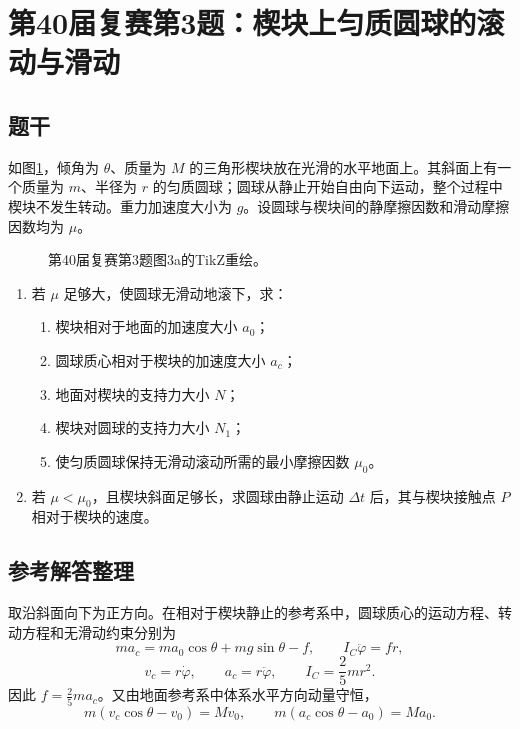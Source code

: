 \section{第40届复赛第3题：楔块上匀质圆球的滚动与滑动}

\subsection{题干}

如图\ref{fig:cpho40q03}，倾角为 $\theta$、质量为 $M$ 的三角形楔块放在光滑的水平地面上。其斜面上有一个质量为 $m$、半径为 $r$ 的匀质圆球；圆球从静止开始自由向下运动，整个过程中楔块不发生转动。重力加速度大小为 $g$。设圆球与楔块间的静摩擦因数和滑动摩擦因数均为 $\mu$。

\begin{figure}[htbp]
  \centering
  
  \caption{第40届复赛第3题图3a的TikZ重绘。}
  \label{fig:cpho40q03}
\end{figure}

\begin{enumerate}
  \item 若 $\mu$ 足够大，使圆球无滑动地滚下，求：
  \begin{enumerate}
    \item 楔块相对于地面的加速度大小 $a_0$；
    \item 圆球质心相对于楔块的加速度大小 $a_c$；
    \item 地面对楔块的支持力大小 $N$；
    \item 楔块对圆球的支持力大小 $N_1$；
    \item 使匀质圆球保持无滑动滚动所需的最小摩擦因数 $\mu_0$。
  \end{enumerate}
  \item 若 $\mu<\mu_0$，且楔块斜面足够长，求圆球由静止运动 $\Delta t$ 后，其与楔块接触点 $P$ 相对于楔块的速度。
\end{enumerate}

\subsection{参考解答整理}

取沿斜面向下为正方向。在相对于楔块静止的参考系中，圆球质心的运动方程、转动方程和无滑动约束分别为
\[
ma_c=ma_0\cos\theta+mg\sin\theta-f,
\qquad I_C\ddot\varphi=fr,
\]
\[
v_c=r\dot\varphi,
\qquad a_c=r\ddot\varphi,
\qquad I_C=\frac25mr^2.
\]
因此 $f=\frac25ma_c$。又由地面参考系中体系水平方向动量守恒，
\[
m(v_c\cos\theta-v_0)=Mv_0,
\qquad m(a_c\cos\theta-a_0)=Ma_0.
\]
